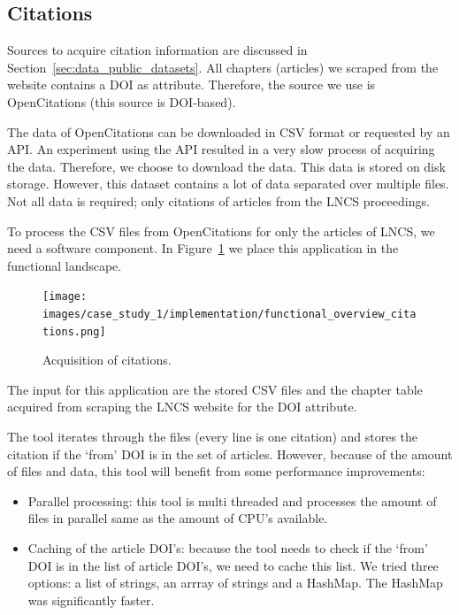 \documentclass{ou-report}
\newcommand{\doi}{{DOI}}
\newcommand{\lncs}{LNCS}
\begin{document}
\subsection{Citations}
Sources to acquire citation information are discussed in
Section~\ref{sec:data_public_datasets}. All chapters (articles) we scraped 
from the website contains a \doi{} as attribute. Therefore, the source we use
is OpenCitations (this source is \doi{}-based).

The data of OpenCitations can be downloaded in CSV format or requested by an API. 
An experiment using the API resulted in a very slow process of acquiring the data.
Therefore, we choose to download the data. This data is stored on disk 
storage. However, this dataset contains a lot of data separated over multiple 
files. Not all data is required; only citations of articles from the \lncs{} 
proceedings. 

To process the CSV files from OpenCitations for only the articles of \lncs{}, we 
need a software component. In Figure~\ref{fig:functional_overview_citations} we place
this application in the functional landscape.

\begin{figure}[H]
    \centering
    \texttt{[image: images/case\_study\_1/implementation/functional\_overview\_citations.png]}
    \caption{Acquisition of citations.}
    \label{fig:functional_overview_citations}
\end{figure}

The input for this application are the stored CSV files and the chapter table 
acquired from scraping the \lncs{} website for the \doi{} attribute.

The tool iterates through the files (every line is
one citation) and stores the citation if the `from' \doi{} is in the set of 
articles. However, because of the amount of files and data, this tool will 
benefit from some performance improvements:
\begin{itemize}
    \item Parallel processing: this tool is multi threaded and processes the 
    amount of files in parallel same as the amount of CPU's available.
    \item Caching of the article \doi{}'s: because the tool needs to check if the
    `from' \doi{} is in the list of article \doi{}'s, we need to cache this list. We
    tried three options: a list of strings, an arrray of strings 
    and a HashMap. The HashMap was significantly faster.
\end{itemize}
\end{document}
